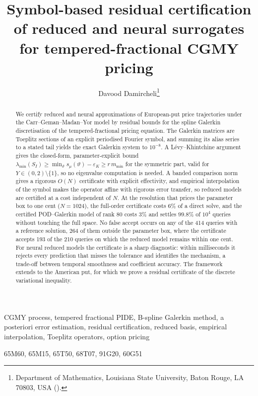 \documentclass[hidelinks]{siamart251216}
\title{Symbol-based residual certification of reduced and neural surrogates for tempered-fractional CGMY pricing}
\author{Davood Damircheli\thanks{Department of Mathematics, Louisiana State University, Baton Rouge, LA 70803, USA
(\email{ddamircheli@lsu.edu}).}}
\begin{document}
\maketitle
\begin{abstract}
We certify reduced and neural approximations of European-put price trajectories under the
Carr--Geman--Madan--Yor model by residual bounds for the spline Galerkin discretisation of the
tempered-fractional pricing equation.  The Galerkin matrices are Toeplitz sections of an explicit
periodised Fourier symbol, and summing its alias series to a stated tail yields the exact Galerkin
system to $10^{-8}$.  A L\'evy--Khintchine argument gives the closed-form, parameter-explicit bound
$\lambda_{\min}(S_I)\ge\min_\vartheta s_\mu(\vartheta)-\varepsilon_K\ge r\,m_{\min}$ for the
symmetric part, valid for $Y\in(0,2)\setminus\{1\}$, so no eigenvalue computation is needed.  A
banded comparison norm gives a rigorous $O(N)$ certificate
with explicit effectivity, and empirical interpolation of the symbol makes the operator affine with rigorous error transfer,
so reduced models are certified at a cost independent of $N$.  At the resolution that prices
the parameter box to one cent ($N=1024$), the full-order certificate costs $6\%$ of a direct solve,
and the certified POD--Galerkin model of rank $80$ costs $3\%$ and settles $99.8\%$ of $10^4$ queries
without touching the full space.  No false accept occurs on any of the 414 queries with a reference
solution, 264 of them outside the parameter box, where the certificate accepts 193 of the 210
queries on which the reduced model remains within one cent.  For neural reduced models the
certificate is a sharp diagnostic: within milliseconds it rejects every prediction that misses the
tolerance and identifies the mechanism, a trade-off between temporal smoothness and coefficient
accuracy.  The framework extends to the American put, for which we prove
a residual certificate of the discrete variational inequality.
\end{abstract}
\begin{keywords}
CGMY process, tempered fractional PIDE, B-spline Galerkin method, a posteriori error estimation,
residual certification, reduced basis, empirical interpolation, Toeplitz operators, option pricing
\end{keywords}
\begin{MSCcodes}
65M60, 65M15, 65T50, 68T07, 91G20, 60G51
\end{MSCcodes}
\end{document}
